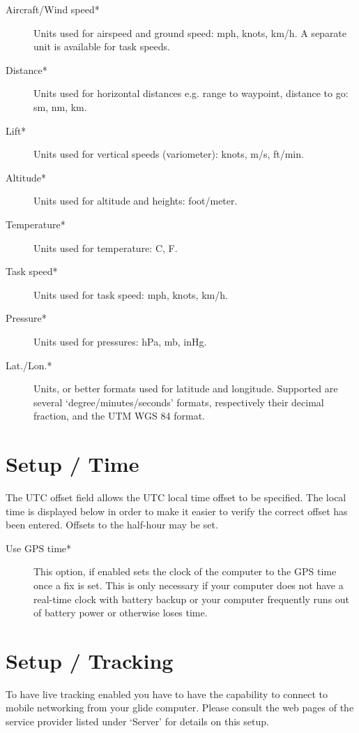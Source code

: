 \begin{description}
\item[Aircraft/Wind speed*]  Units used for airspeed and ground speed: mph, 
  knots, km/h. A separate unit is available for task speeds.
\item[Distance*]  Units used for horizontal distances e.g. range to waypoint, 
  distance to go: sm, nm, km.
\item[Lift*]  Units used for vertical speeds (variometer): knots, m/s, ft/min.
\item[Altitude*] Units used for altitude and heights: foot/meter.
\item[Temperature*]  Units used for temperature: \degree C, \degree F.
\item[Task speed*] Units used for task speed: mph, knots, km/h.
\item[Pressure*]  Units used for pressures: hPa, mb, inHg.
\item[Lat./Lon.*]  Units, or better formats used for latitude and longitude. 
  Supported are several `degree/minutes/seconds' formats, respectively 
  their decimal fraction, and the  UTM WGS 84 format.
\end{description}


\section{Setup / Time}

The UTC offset field allows the UTC local time offset to be specified.
The local time is displayed below in order to make it easier to verify
the correct offset has been entered.  Offsets to the half-hour may be
set.

\begin{description}
\item[Use GPS time*] This option, if enabled sets the clock of the computer to 
  the GPS time once a fix is set. This is only necessary if your computer does 
  not have a real-time clock with battery backup or your computer 
  frequently runs out of battery power or otherwise loses time.
\end{description}


\section{Setup / Tracking}

To have live tracking enabled you have to have the capability to connect to 
mobile networking from your glide computer.
Please consult the web pages of the service provider listed under `Server' 
for details on this setup.



